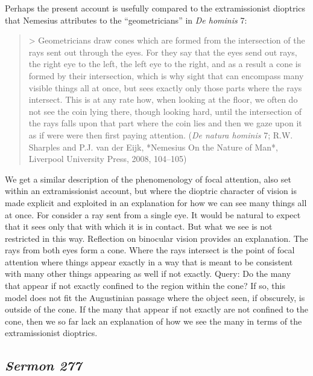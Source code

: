 \documentclass[12pt]{article}
\begin{document}
Perhaps the present account is usefully compared to the extramissionist dioptrics that Nemesius attributes to the ``geometricians'' in \emph{De hominis} 7:
\begin{quote}
	> Geometricians draw cones which are formed from the intersection of the rays sent out through the eyes. For they say that the eyes send out rays, the right eye to the left, the left eye to the right, and as a result a cone is formed by their intersection, which is why sight that can encompass many visible things all at once, but sees exactly only those parts where the rays intersect. This is at any rate how, when looking at the floor, we often do not see the coin lying there, though looking hard, until the intersection of the rays falls upon that part where the coin lies and then we gaze upon it as if were were then first paying attention. (\emph{De natura hominis} 7; R.W. Sharples and P.J. van der Eijk, *Nemesius On the Nature of Man*, Liverpool University Press, 2008, 104--105)
\end{quote}
We get a similar description of the phenomenology of focal attention, also set within an extramissionist account, but where the dioptric character of vision is made explicit and exploited in an explanation for how we can see many things all at once. For consider a ray sent from a single eye. It would be natural to expect that it sees only that with which it is in contact. But what we see is not restricted in this way. Reflection on binocular vision provides an explanation. The rays from both eyes form a cone. Where the rays intersect is the point of focal attention where things appear exactly in a way that is meant to be consistent with many other things appearing as well if not exactly. Query: Do the many that appear if not exactly confined to the region within the cone? If so, this model does not fit the Augustinian passage where the object seen, if obscurely, is outside of the cone. If the many that appear if not exactly are not confined to the cone, then we so far lack an explanation of how we see the many in terms of the extramissionist dioptrics.


\subsection{\emph{Sermon 277}} %
\label{sub:subsection_name}
\end{document}
